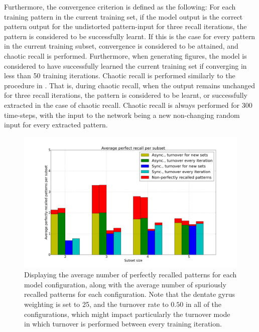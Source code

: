 Furthermore, the convergence criterion is defined as the following: For each training pattern in the current training set, if the model output is the correct pattern output for the undistorted pattern-input for three recall iterations, the pattern is considered to be successfully learnt. If this is the case for every pattern in the current training subset, convergence is considered to be attained, and chaotic recall is performed. Furthermore, when generating figures, the model is considered to have successfully learned the current training set if converging in less than 50 training iterations. Chaotic recall is performed similarly to the procedure in \citep{Hattori2010, Hattori2014}. That is, during chaotic recall, when the output remains unchanged for three recall iterations, the pattern is considered to be learnt, or successfully extracted in the case of chaotic recall. Chaotic recall is always performed for 300 time-steps, with the input to the network being a new non-changing random input for every extracted pattern.


\begin{figure}
    \centering
    \includegraphics[width=14cm]{fig/average_perfect_recall_rates_by_set_size_with_spurious_bars}
    \caption{Displaying the average number of perfectly recalled patterns for each model configuration, along with the average number of spuriously recalled patterns for each configuration. Note that the dentate gyrus weighting is set to 25, and the turnover rate to $0.50$ in all of the configurations, which might impact particularly the turnover mode in which turnover is performed between every training iteration.}
    \label{fig:avg_perfect_recall_rates_with_spurious_bars}
\end{figure}


